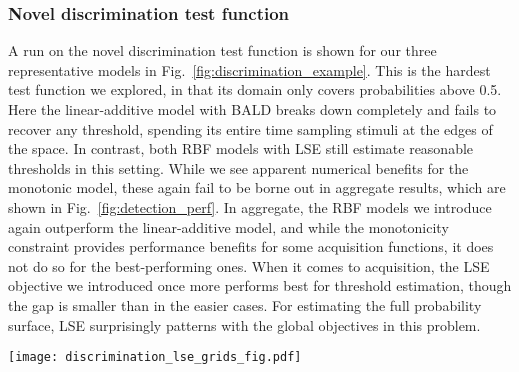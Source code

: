 \documentclass[../main.tex]{subfiles}
\begin{document}
\subsubsection{Novel discrimination test function}
A run on the novel discrimination test function is shown for our three representative models in Fig.~\ref{fig:discrimination_example}. This is the hardest test function we explored, in that its domain only covers probabilities above 0.5. Here the linear-additive model with BALD breaks down completely and fails to recover any threshold, spending its entire time sampling stimuli at the edges of the space. In contrast, both RBF models with LSE still estimate reasonable thresholds in this setting. While we see apparent numerical benefits for the monotonic model, these again fail to be borne out in aggregate results, which are shown in Fig.~\ref{fig:detection_perf}. In aggregate, the RBF models we introduce again outperform the linear-additive model, and while the monotonicity constraint provides performance benefits for some acquisition functions, it does not do so for the best-performing ones. When it comes to acquisition, the LSE objective we introduced once more performs best for threshold estimation, though the gap is smaller than in the easier cases. For estimating the full probability surface, LSE surprisingly patterns with the global objectives in this problem.

\begin{figure*}[!htb]
    \centering
    \texttt{[image: discrimination\_lse\_grids\_fig.pdf]}
    \caption{\textbf{Example of samples taken by three representative models on the novel discrimination test function after 100 trials}. All models begin with the same 5 trials generated from a Sobol sequence and then proceed according to their acquisition function (BALD in the case of the linear-additive model; LSE otherwise). We used 100 rather than 50 example trials here because the test function is substantially more difficult than the others. The linear-additive model with BALD fails completely on this task: after observing a few correct trials (consistent with the whole space generating probabilities above 0.5), the model is over-confident over the interior of the space and solely samples at the edges. Both RBF models perform acceptably, though in this case the monotonic model spends fewer trials sampling the upper and side edges (where the threshold is unlikely to be under the monotonicity assumption), and achieves a more accurate mean estimate. This pattern was not consistent on average over replications, however. }
    \label{fig:discrimination_example}
\end{figure*}
\end{document}
